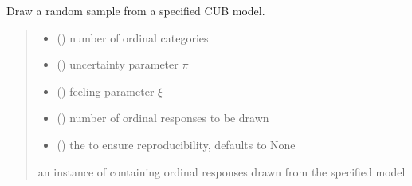 \documentclass[letterpaper,10pt,english]{sphinxmanual}
\begin{document}
\begin{fulllineitems}
\label{\detokenize{cubmods:cubmods.cub.draw}}
\pysigstartsignatures
{}
\pysigstopsignatures
\sphinxAtStartPar
Draw a random sample from a specified CUB model.
\begin{quote}\begin{description}
\begin{itemize}
\item {} 
\sphinxAtStartPar
{} () \textendash{} number of ordinal categories

\item {} 
\sphinxAtStartPar
{} () \textendash{} uncertainty parameter \(\pi\)

\item {} 
\sphinxAtStartPar
{} () \textendash{} feeling parameter \(\xi\)

\item {} 
\sphinxAtStartPar
{} () \textendash{} number of ordinal responses to be drawn

\item {} 
\sphinxAtStartPar
{} (\sphinxstyleliteralemphasis{\sphinxupquote{, }}) \textendash{} the  to ensure reproducibility, defaults to None

\end{itemize}

\sphinxAtStartPar
an instance of  containing ordinal responses drawn from the specified model

\end{description}\end{quote}

\end{fulllineitems}
\end{document}
